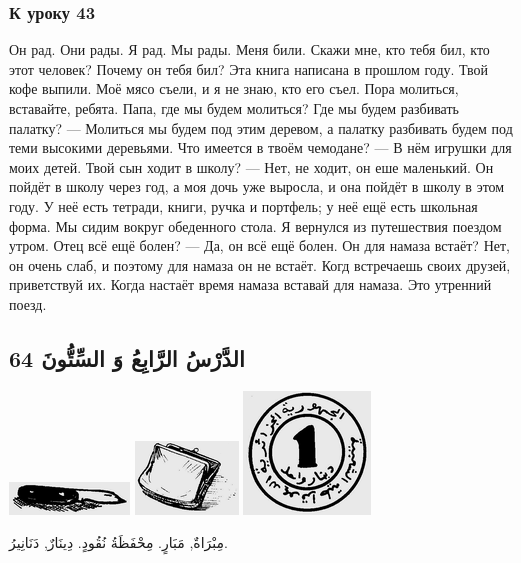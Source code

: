 \documentclass[a5paper]{article}
\begin{document}
\subsubsection{К уроку 43}
Он рад. Они рады. Я рад. Мы рады. Меня били. Скажи мне, кто тебя бил, кто этот человек? Почему он тебя бил? Эта книга написана в прошлом году. Твой кофе выпили. Моё мясо съели, и я не знаю, кто его съел. Пора молиться, вставайте, ребята. Папа, где мы будем молиться? Где мы будем разбивать палатку? — Молиться мы будем под этим деревом, а палатку разбивать будем под теми высокими деревьями. Что имеется в твоём чемодане? — В нём игрушки для моих детей. Твой сын ходит в школу? — Нет, не ходит, он еше маленький. Он пойдёт в школу через год, а моя дочь уже выросла, и она пойдёт в школу в этом году. У неё есть тетради, книги, ручка и портфель; у неё ещё есть школьная форма. Мы сидим вокруг обеденного стола. Я вернулся из путешествия поездом утром. Отец всё ещё болен? — Да, он всё ещё болен. Он для намаза встаёт? Нет, он очень слаб, и поэтому для намаза он не встаёт. Когд встречаешь своих друзей, приветствуй их. Когда настаёт время намаза вставай для намаза. Это утренний поезд.

\subsection{الدَّرْسُ الرَّابِعُ وَ السِّتُّونَ 64}
 \includegraphics[width=1.2602in,height=0.3437in]{images/MuhammadBagauddinprettified-img213.png}   \includegraphics[width=1.0835in,height=0.7709in]{images/MuhammadBagauddinprettified-img214.png}   \includegraphics[width=1.3335in,height=1.2917in]{images/MuhammadBagauddinprettified-img215.png} 

مِبْرَاةٌ, مَبَارٍ. مِحْفَظَةُ نُقُودٍ. دِينَارٌ, دَنَانِيرُ. 
\end{document}
